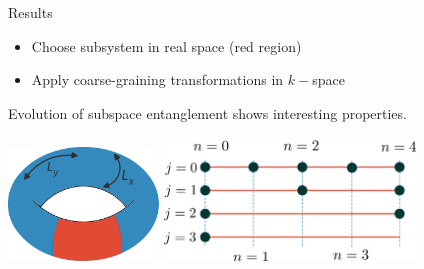 \documentclass[aspectratio=169]{beamer}
\begin{document}
\begin{frame}{Results}

\begin{itemize}
	\item Choose subsystem in real space (red region)
	\item Apply \alert{coarse-graining transformations} in \(k-\)space
\end{itemize}

\vspace*{\fill}
Evolution of subspace entanglement shows interesting properties.

\vspace*{\fill}
\includegraphics[width=0.3\textwidth]{subsystem-torus.pdf}
\hspace*{\fill}
\includegraphics[width=0.5\textwidth]{coarse-graining.pdf}
\end{frame}
\end{document}
